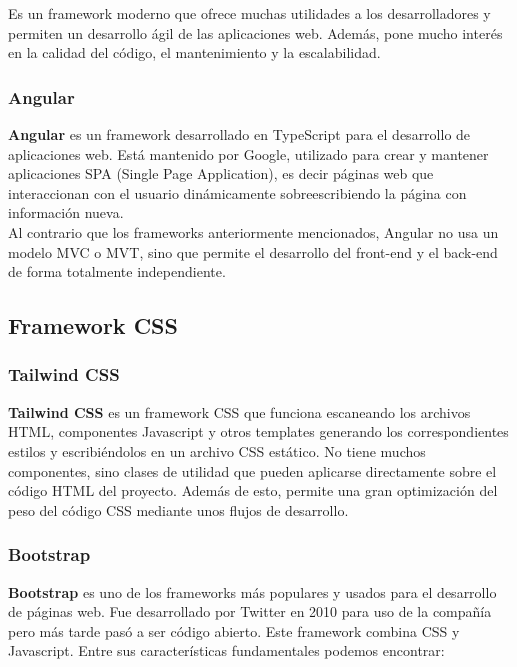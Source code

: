     Es un framework moderno que ofrece muchas utilidades a los desarrolladores y permiten un
    desarrollo ágil de las aplicaciones web. Además, pone mucho interés en la calidad del
    código, el mantenimiento y la escalabilidad.

    \subsubsection{Angular}
    \textbf{Angular} \cite{angular} es un framework desarrollado en TypeScript para el
    desarrollo de aplicaciones web. Está mantenido por Google, utilizado para crear y mantener
    aplicaciones SPA (Single Page Application), es decir páginas web que interaccionan con el
    usuario dinámicamente sobreescribiendo la página con información nueva.\\

    Al contrario que los frameworks anteriormente mencionados, Angular no usa un modelo MVC
    o MVT, sino que permite el desarrollo del front-end y el back-end de forma totalmente
    independiente.

\subsection{Framework CSS}

    \subsubsection{Tailwind CSS}
    \textbf{Tailwind CSS} \cite{tailwind-css} es un framework CSS que funciona escaneando los
    archivos HTML, componentes Javascript y otros templates generando los correspondientes
    estilos y escribiéndolos en un archivo CSS estático. No tiene muchos componentes, sino
    clases de utilidad que pueden aplicarse directamente sobre el código HTML del proyecto.
    Además de esto, permite una gran optimización del peso del código CSS mediante unos flujos
    de desarrollo.
        
    \subsubsection{Bootstrap}
    \textbf{Bootstrap} \cite{bootstrap} es uno de los frameworks más populares y usados para
    el desarrollo de páginas web. Fue desarrollado por Twitter en 2010 para uso de la compañía
    pero más tarde pasó a ser código abierto. Este framework combina CSS y Javascript. Entre
    sus características fundamentales podemos encontrar:
    
